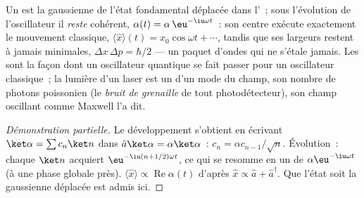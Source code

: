 \begin{proposition}\label{prop:b3:harmonic-oscillator:coherent-motion}
Un  est la gaussienne de l'état fondamental déplacée dans
l'~; sous l'évolution de l'oscillateur il \emph{reste}
cohérent, $\alpha(t) = \alpha\,\eu^{-\iu\omega t}$~: son centre exécute
exactement le mouvement classique, $\langle\hat x\rangle(t) =
x_0\cos\omega t + \cdots$, tandis que ses largeurs restent à jamais
minimales, $\Delta x\,\Delta p = \hbar/2$ --- un paquet d'ondes qui ne
s'étale jamais. Les  sont la façon dont un oscillateur
quantique se fait passer pour un oscillateur classique~; la lumière
d'un laser est un  d'un mode du champ, son nombre de
photons poissonien (le \emph{bruit de grenaille} de tout
photodétecteur), son champ oscillant comme Maxwell l'a dit.
\end{proposition}

\begin{proof}[Démonstration partielle]
Le développement s'obtient en écrivant $\ket\alpha = \sum c_n\ket n$
dans $\hat a\ket\alpha = \alpha\ket\alpha$~: $c_n = \alpha c_{n-1}/\sqrt
n$. Évolution~: chaque $\ket n$ acquiert $\eu^{-\iu(n + 1/2)\omega t}$,
ce qui se resomme en un  de $\alpha\eu^{-\iu\omega t}$
(à une phase globale près). $\langle\hat x\rangle \propto
\operatorname{Re}\alpha(t)$ d'après $\hat x \propto \hat a +
\hat a^\dagger$. Que l'état soit la gaussienne déplacée est admis ici.
\end{proof}

